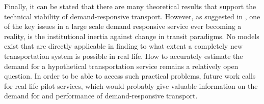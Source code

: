 \documentclass[dissertation,draft*]{aaltoseries}
\begin{document}
% 

Finally, it can be stated that there are many theoretical results
that support the technical viability of demand-responsive transport.
However, as suggested in \cite{cortes}, one of the key issues in a large scale demand 
responsive service ever becoming a reality, is the
institutional inertia against change in transit paradigms. No models exist that are
directly applicable in finding to what extent a completely new transportation system is possible in real life.
How to accurately estimate the demand for a hypothetical transportation service remains a relatively open question.
In order to be able to access such practical problems, future work calls for 
real-life pilot services, which would probably give valuable information on the 
demand for and performance of demand-responsive transport.
\end{document}
